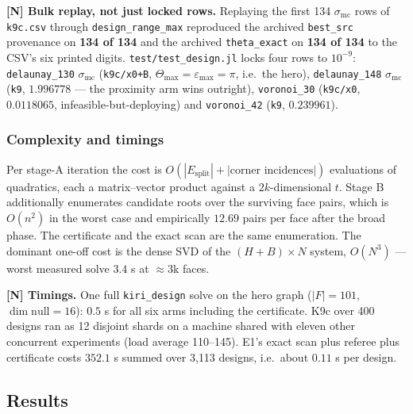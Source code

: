 \documentclass[11pt,a4paper]{article}
\theoremstyle{definition}
\newcommand{\Tmax}{\Theta_{\max}}
\newcommand{\Esplit}{E_{\mathrm{split}}}
\newcommand{\file}[1]{\texttt{\small #1}}
\begin{document}
\noindent \textbf{[N] Bulk replay, not just locked rows.} Replaying the first 134
$\sigma_{\mathrm{mc}}$ rows of \file{k9c.csv} through \file{design\_range\_max} reproduced the
archived \file{best\_src} provenance on \textbf{134 of 134} and the archived
\file{theta\_exact} on \textbf{134 of 134} to the CSV's six printed digits.
\file{test/test\_design.jl} locks four rows to $10^{-9}$: \file{delaunay\_130}
$\sigma_{\mathrm{mc}}$ (\texttt{k9c/x0+B}, $\Tmax=\varepsilon_{\max}=\pi$, i.e.\ the hero),
\file{delaunay\_148} $\sigma_{\mathrm{mc}}$ (\texttt{k9}, $1.996778$ --- the proximity arm
wins outright), \file{voronoi\_30} (\texttt{k9c/x0}, $0.0118065$, infeasible-but-deploying)
and \file{voronoi\_42} (\texttt{k9}, $0.239961$).

\subsubsection{Complexity and timings}

Per stage-A iteration the cost is $O(|\Esplit| + |\text{corner incidences}|)$ evaluations of
quadratics, each a matrix--vector product against a $2k$-dimensional $t$. Stage B additionally
enumerates candidate roots over the surviving face pairs, which is $O(n^2)$ in the worst case
and empirically $12.69$ pairs per face after the broad phase. The certificate and the exact
scan are the same enumeration. The dominant one-off cost is the dense SVD of the
$(H+B)\times N$ system, $O(N^3)$ --- worst measured solve $3.4$ s at $\approx3$k faces.

\textbf{[N] Timings.} One full \file{kiri\_design} solve on the hero graph
($|F|=101$, $\dim\mathrm{null}=16$): $0.5$ s for all six arms including the certificate.
K9c over 400 designs ran as 12 disjoint shards on a machine shared with eleven other
concurrent experiments (load average 110--145). E1's exact scan plus referee plus certificate
costs $352.1$ s summed over 3{,}113 designs, i.e.\ about $0.11$ s per design.

\subsection{Results}
\end{document}
